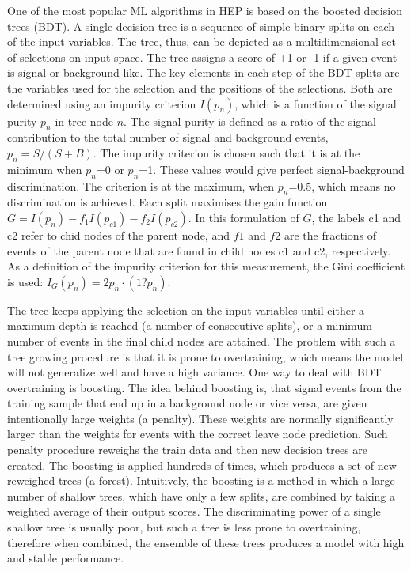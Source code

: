 \begin{small}
One of the most popular ML algorithms in HEP is based on the boosted decision trees (BDT). A single decision tree is a sequence of simple binary splits on each of the input variables. The tree, thus, can be depicted as a multidimensional set of selections on input space. The tree assigns a score of +1 or -1 if a given event is signal or background-like. The key elements in each step of the BDT splits are the variables used for the selection and the positions of the selections. Both are determined using an impurity criterion $I(p_n)$, which is a function of the signal purity $p_n$ in tree node $n$. The signal purity is defined as a ratio of the signal contribution to the total number of signal and background events, $p_n = S/(S+B)$. The impurity criterion is chosen such that it is at the minimum when $p_n$=0 or $p_n$=1. These values would give perfect signal-background discrimination. The criterion is at the maximum, when $p_n$=0.5, which means no discrimination is achieved. 
Each split maximises the gain function $G=I(p_n) - f_1I(p_{c1})-f_2I(p_{c2})$. In this formulation of $G$, the labels c1 and c2 refer to chid nodes of the parent node, and $f1$ and $f2$ are the fractions of events of the parent node that are found in child nodes c1 and c2, respectively. As a definition of the impurity criterion for this measurement, the Gini coefficient is used: $I_G(p_n) = 2 p_n \cdot (1?p_n)$. 

The tree keeps applying the selection on the input variables until either a maximum depth is reached (a number of consecutive splits), or a minimum number of events in the final child nodes are attained. The problem with such a tree growing procedure is that it is prone to overtraining, which means the model will not generalize well and have a high variance. One way to deal with BDT overtraining is boosting. 
The idea behind boosting is, that signal events from the training sample that end up in a background node or vice versa, are given intentionally large weights (a penalty). These weights are normally significantly larger than the weights for events with the correct leave node prediction. Such penalty procedure reweighs the train data and then new decision trees are created. The boosting is applied hundreds of times, which produces a set of new reweighed trees (a forest). Intuitively, the boosting is a method in which a large number of shallow trees, which have only a few splits, are combined by taking a weighted average of their output scores. The discriminating power of a single shallow tree is usually poor, but such a tree is less prone to overtraining, therefore when combined, the ensemble of these trees produces a model with high and stable performance.
 

\end{small}
